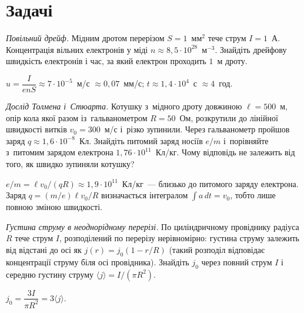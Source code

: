 \section*{Задачі}
{}


\begin{problem}\label{prb:DriftVelocityCopper}
	\emph{Повільний дрейф.} Мідним дротом перерізом $S=1$~мм$^2$ тече струм $I=1$~А. Концентрація вільних електронів у міді
	$n\approx8{,}5\cdot10^{28}$~м$^{-3}$. Знайдіть дрейфову швидкість електронів і час, за який електрон проходить $1$~м дроту.
	\begin{solution}
		$u=\dfrac{I}{enS}\approx7\cdot10^{-5}$~м/с $\approx0{,}07$~мм/с; $t\approx1{,}4\cdot10^{4}$~с $\approx4$~год.
	\end{solution}
\end{problem}

\begin{problem}\label{prb:TolmanStewartEstimate}
	\emph{Дослід Толмена і~Стюарта.} Котушку з~мідного дроту довжиною $\ell = 500$~м, опір
	кола якої разом із~гальванометром $R = 50$~Ом, розкрутили до лінійної швидкості витків
	$v_0 = 300$~м/с і~різко зупинили. Через гальванометр пройшов заряд $q \approx
	1{,}6\cdot10^{-8}$~Кл. Знайдіть питомий заряд носіїв $e/m$ і~порівняйте з~питомим зарядом
	електрона $1{,}76\cdot10^{11}$~Кл/кг. Чому відповідь не залежить від того, як швидко
	зупиняли котушку?
	\begin{solution}
		$e/m = \ell v_0/(qR) \approx 1{,}9\cdot10^{11}$~Кл/кг~--- близько до питомого заряду електрона. Заряд $q = (m/e)\ell v_0/R$ визначається інтегралом $\int a\,dt = v_0$, тобто лише повною зміною швидкості.
	\end{solution}
\end{problem}

\begin{problem}\label{prb:CurrentDensityVector}
	\emph{Густина струму в неоднорідному перерізі.} По циліндричному провіднику радіуса $R$ тече струм $I$, розподілений по перерізу
	нерівномірно: густина струму залежить від відстані до осі як $j(r)=j_0\left(1-r/R\right)$ (такий розподіл відповідає концентрації струму біля осі провідника). Знайдіть $j_0$ через
	повний струм $I$ і середню густину струму $\langle j\rangle=I/(\pi R^2)$.
	\begin{solution}
		$j_0=\dfrac{3I}{\pi R^2}=3\langle j\rangle$.
	\end{solution}
\end{problem}

